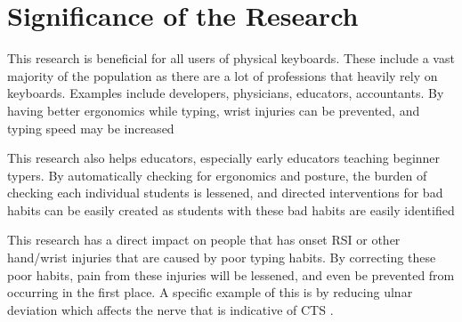 \documentclass{report}
\begin{document}
\section{Significance of the Research}
This research is beneficial for all users of physical keyboards. These include a
vast majority of the population as there are a lot of professions that heavily
rely on keyboards. Examples include developers, physicians, educators,
accountants. By having better ergonomics while typing, wrist injuries can be
prevented, and typing speed may be increased

This research also helps educators, especially early educators teaching beginner
typers. By automatically checking for ergonomics and posture, the burden of
checking each individual students is lessened, and directed interventions for
bad habits can be easily created as students with these bad habits are easily
identified

This research has a direct impact on people that has onset RSI or other
hand/wrist injuries that are caused by poor typing habits. By correcting these
poor habits, pain from these injuries will be lessened, and even be prevented
from occurring in the first place. A specific example of this is by reducing
ulnar deviation which affects the nerve that is indicative of CTS
\parencite{toosi2015}.

\newpage
\nocite{*} \printbibliography[heading=bibintoc,title={References}]{}
\end{document}
